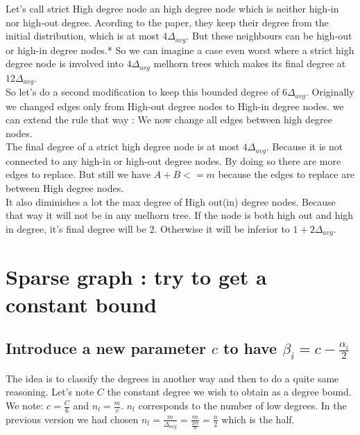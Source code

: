 \documentclass{article}
\begin{document}
Let's call strict High degree node an high degree node which is neither
high-in nor high-out degree. Acording to the paper, they keep their
degree from the initial distribution, which is at most $4\Delta_{avg}$.
But these neighbours can be high-out or high-in degree nodes.*
So we can imagine a case even worst where a strict high degree node
is involved into $4\Delta_{avg}$ melhorn trees which makes its
final degree at $12\Delta_{avg}$.\\

So let's do a second modification to keep this bounded degree of $6\Delta_{avg}$.
Originally we changed edges only from High-out degree nodes
to High-in degree nodes. we can extend the rule that way :
We now change all edges between high degree nodes.\\

The final degree of a strict high degree node is at most $4\Delta_{avg}$.
Because it is not connected to any high-in or high-out degree nodes.
By doing so there are more edges to replace.
But still we have $ A + B <= m$
because the edges to replace are between High degree nodes.\\

It also diminishes a lot the max degree of High out(in) degree nodes.
Because that way it will not be in any melhorn tree.
If the node is both high out and high in degree, it's final degree will
be 2. Otherwise it will be inferior to $1+2\Delta_{avg}$.

\newpage
\section{Sparse graph : try to get a constant bound}

\subsection{Introduce a new parameter $c$ to have $\beta_i=c-\frac{\alpha_i}{2}$}

The idea is to classify the degrees in another way and then to do a
quite same reasoning. Let's note $C$ the constant degree we wish to
obtain as a degree bound. We note: $c = \frac{C}{6}$ and $n_l = \frac{m}{c}$.
$n_l$ corresponds to the number of low degrees. In the previous version
we had chosen $n_l = \frac{m}{\Delta_{avg}} = \frac{m}{\frac{2m}{n}} = \frac{n}{2}$
which is the half.\\
\end{document}
